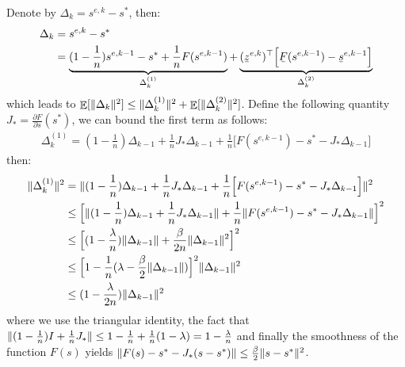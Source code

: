 \documentclass[11pt]{article}
\theoremstyle{plain}
\DeclarePairedDelimiter{\norm}{\lVert}{\rVert}
\DeclareMathOperator*{\E}{\mathbb{E}}
\theoremstyle{plain}
\theoremstyle{definition}
\newcommand\barbelow[1]{\stackunder[1.2pt]{$#1$}{\rule{.8ex}{.075ex}}}
\begin{document}
Denote by $\Delta_k = s^{e,k} - s^*$, then:
\begin{equation}
\begin{split}
\Delta_k & = s^{e,k} - s^* \\
& = \underbrace{(1-\frac{1}{n}) s^{e,k-1} - s^*  +  \frac{1}{n}  F(s^{e,k-1})}_{\Delta_k^{(1)}}  + \underbrace{(\barbelow{z}^{e,k})^\top \Big[ \barbelow{F}(s^{e,k-1}) - \barbelow{s}^{e,k-1} \Big]}_{\Delta_k^{(2)}}
\end{split}
\end{equation}
which leads to $\E[\norm{\Delta_k}^2] \leq \norm{\Delta_k^{(1)}}^2 + \E[\norm{\Delta_k^{(2)}}^2] $.
Define the following quantity $J_* = \frac{\partial F}{\partial s}(s^*)$, we can bound the first term as follows:
\begin{equation}
\begin{split}
\Delta_k^{(1)} = (1-\frac{1}{n})\Delta_{k-1} + \frac{1}{n}J_* \Delta_{k-1} +  \frac{1}{n} \Big[ F(s^{e,k-1}) - s^* -J_* \Delta_{k-1}\Big]
\end{split}
\end{equation}
then:
\begin{equation}
\begin{split}
\norm{\Delta_k^{(1)}}^2 & = \norm{(1-\frac{1}{n})\Delta_{k-1} + \frac{1}{n} J_* \Delta_{k-1} +  \frac{1}{n} \Big[ F(s^{e,k-1}) - s^* -J_* \Delta_{k-1}\Big]}^2 \\
& \leq \Big[ \norm{(1-\frac{1}{n}) \Delta_{k-1} + \frac{1}{n}J_* \Delta_{k-1} } + \frac{1}{n} \norm{ F(s^{e,k-1}) - s^* -J_* \Delta_{k-1}}\Big]^2 \\
& \leq \Big[ (1-\frac{\lambda}{n})\norm{\Delta_{k-1}} + \frac{\beta}{2n} \norm{\Delta_{k-1}}^2 \Big]^2\\
& \leq \Big[ 1 - \frac{1}{n}(\lambda - \frac{\beta}{2} \norm{\Delta_{k-1}}) \Big]^2 \norm{\Delta_{k-1}}^2\\
& \leq (1 - \frac{\lambda}{2n})\norm{\Delta_{k-1}}^2
\end{split}
\end{equation}
where we use the triangular identity, the fact that $\norm{(1 - \frac{1}{n})I + \frac{1}{n} J_*} \leq 1 - \frac{1}{n} + \frac{1}{n}(1-\lambda) = 1 - \frac{\lambda}{n}$ and finally the smoothness of the function $F(s)$ yields $\norm{F(s) - s^* - J_* (s - s^*)} \leq \frac{\beta}{2}\norm{s - s^*}^2$.
\end{document}
